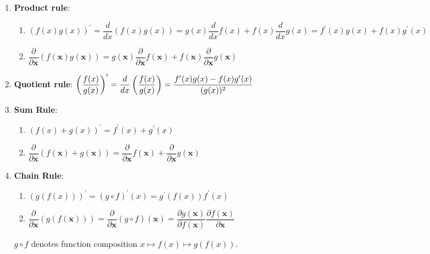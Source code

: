 \begin{enumerate}
    \item \textbf{Product rule}: 
    \begin{enumerate}
        \item $
            (f(x)g(x))^\prime
            = \dfrac{d}{dx}(f(x)g(x))
            = g(x)\dfrac{d}{dx}f(x) + f(x)\dfrac{d}{dx}g(x)
            = f^\prime(x)g(x) + f(x)g^\prime(x)
        $
        \hfill \cite{mfml/book/mml/Deisenroth-Faisal-Ong}

        \item $
            \dfrac{\partial}{\partial \bm{x}}(f(\bm{x})g(\bm{x}))
            = g(\bm{x})\dfrac{\partial}{\partial \bm{x}}f(\bm{x}) 
                + f(\bm{x})\dfrac{\partial}{\partial \bm{x}}g(\bm{x})
        $ \hfill \cite{mfml/book/mml/Deisenroth-Faisal-Ong}
    \end{enumerate}

    \item \textbf{Quotient rule}:
    $
        \left(\dfrac{f(x)}{g(x)}\right)^\prime
        = \dfrac{d}{dx}\left(\dfrac{f(x)}{g(x)}\right)
        = \dfrac{f^\prime(x)g(x) - f(x)g^\prime(x)}{(g(x))^2}
    $
    \hfill \cite{mfml/book/mml/Deisenroth-Faisal-Ong}

    \item \textbf{Sum Rule}:
    \begin{enumerate}
        \item $
            (f(x) + g(x))^\prime
            = f^\prime(x) + g^\prime(x)
        $
        \hfill \cite{mfml/book/mml/Deisenroth-Faisal-Ong}

        \item $
            \dfrac{\partial}{\partial \bm{x}}(f(\bm{x}) + g(\bm{x}))
            = \dfrac{\partial}{\partial \bm{x}}f(\bm{x}) 
                + \dfrac{\partial}{\partial \bm{x}}g(\bm{x})
        $
        \hfill \cite{mfml/book/mml/Deisenroth-Faisal-Ong}
    \end{enumerate}

    \item \textbf{Chain Rule}: 
    \begin{enumerate}
        \item $
            (g(f(x)))^\prime
            = (g \circ f)^\prime(x)
            = g^\prime(f(x)) f^\prime(x)
        $
        \hfill \cite{mfml/book/mml/Deisenroth-Faisal-Ong}

        \item $
            \dfrac{\partial}{\partial \bm{x}}(g(f(\bm{x})))
            = \dfrac{\partial}{\partial \bm{x}}(g \circ f)(\bm{x})
            = \dfrac{\partial g(\bm{x})}{\partial f(\bm{x})}
                \dfrac{\partial f(\bm{x})}{\partial \bm{x}}
        $
        \hfill \cite{mfml/book/mml/Deisenroth-Faisal-Ong}
    \end{enumerate}
    $g \circ f$ denotes function composition $x \mapsto f (x) \mapsto g(f (x))$.
    \hfill \cite{mfml/book/mml/Deisenroth-Faisal-Ong}
\end{enumerate}


